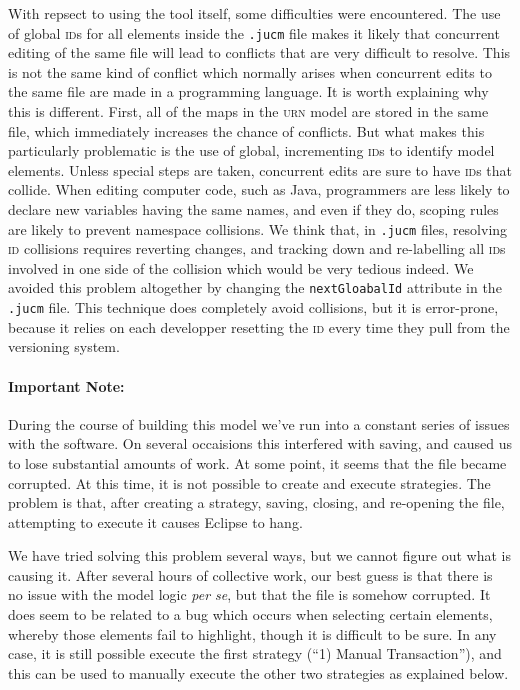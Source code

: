 \documentclass[10pt,fleqn]{article}
\begin{document}
	With repsect to using the tool itself, some difficulties were encountered.
	The use of global \textsc{id}s for all elements inside the \texttt{.jucm} 
	file makes it 
	likely that concurrent editing of the same file will lead to conflicts
	that are very difficult to resolve.  This is not the same kind of conflict
	which normally arises when concurrent edits to the same file are made in
	a programming language.  It is worth explaining why this is different.  
	First, all of the maps in the \textsc{urn} model are stored in the same 
	file, which
	immediately increases the chance of conflicts.  But what makes this
	particularly problematic is the use of global, incrementing \textsc{id}s 
	to identify model elements.  Unless special steps are taken, 
	concurrent edits are sure to have \textsc{id}s that collide.  When
	editing computer code, such as Java,  programmers are 
	less likely to declare new variables having the same names, and even if
	they do, scoping rules are likely to prevent namespace collisions.  
	We think that, in \texttt{.jucm} files, resolving \textsc{id} collisions 
	requires 
	reverting changes, and tracking down and re-labelling all \textsc{id}s 
	involved in 
	one side of the collision which would be very tedious indeed.  We avoided 
	this problem altogether by changing the 
	\texttt{nextGloabalId} attribute in the \texttt{.jucm} file.  This 
	technique does completely avoid collisions, but it is error-prone, 
	because it relies on each developper resetting the \textsc{id} every time they pull
	from the versioning system.

	\paragraph{Important Note:} During the course of building this model
	we've run into a constant series of issues with the  software.  On
	several occaisions this interfered with saving, and caused us
	to lose substantial amounts of work.  At some point, it seems that the 
	file became corrupted.  At this time, it is not
	possible to create and execute strategies.  The problem is that, after
	creating a strategy, saving, closing, and re-opening the file, attempting 
	to execute it causes Eclipse to hang.

	We have tried 
	solving this problem several ways, but we cannot figure out what is causing
	it.  After several hours of collective work, our best guess is that 
	there is no issue with the model logic \textit{per se}, but that the file 
	is somehow corrupted.
	It does seem to be related to a bug which occurs when selecting
	certain elements, whereby those elements fail to highlight, though it is 
	difficult to be sure.  In any case,
	it is still possible execute the first strategy
	(``1) Manual Transaction''), and this can be used to manually execute
	the other two strategies as explained below.
\end{document}
